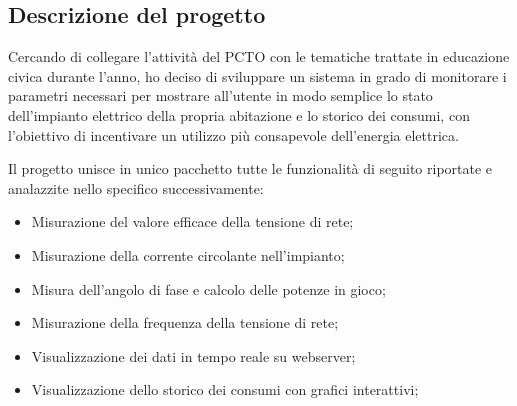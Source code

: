 \subsection{Descrizione del progetto}
Cercando di collegare l'attività del PCTO con le tematiche trattate in
educazione civica durante l'anno, ho deciso di sviluppare un sistema in grado di
monitorare i parametri necessari per mostrare all'utente in modo semplice lo
stato dell'impianto elettrico della propria abitazione e lo storico dei consumi,
con l'obiettivo di incentivare un utilizzo più consapevole dell'energia
elettrica.

Il progetto unisce in unico pacchetto tutte le funzionalità di seguito riportate
e analazzite nello specifico successivamente:

\begin{itemize}
    \item Misurazione del valore efficace della tensione di rete;
    \item Misurazione della corrente circolante nell'impianto;
    \item Misura dell'angolo di fase e calcolo delle potenze in gioco;
    \item Misurazione della frequenza della tensione di rete;
    \item Visualizzazione dei dati in tempo reale su webserver;
    \item Visualizzazione dello storico dei consumi con grafici interattivi;
\end{itemize}